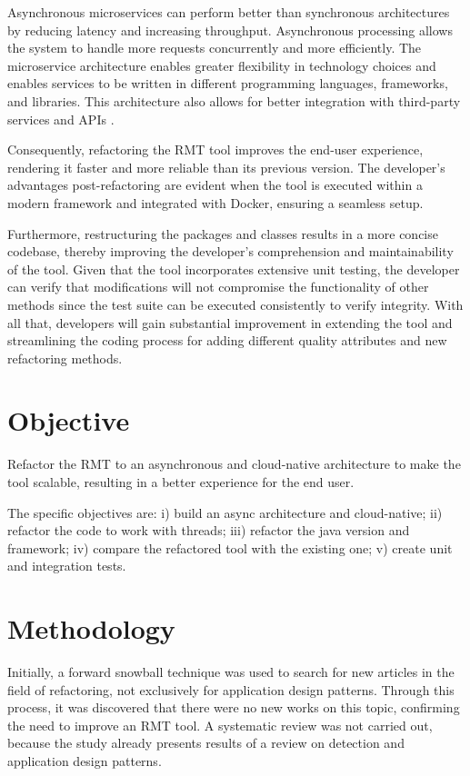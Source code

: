 Asynchronous microservices can perform better than synchronous architectures by reducing latency and increasing throughput. Asynchronous processing allows the system to handle more requests concurrently and more efficiently. The microservice architecture enables greater flexibility in technology choices and enables services to be written in different programming languages, frameworks, and libraries. This architecture also allows for better integration with third-party services and APIs \cite{larrucea2018}.

Consequently, refactoring the RMT tool improves the end-user experience, rendering it faster and more reliable than its previous version. The developer's advantages post-refactoring are evident when the tool is executed within a modern framework and integrated with Docker, ensuring a seamless setup. 

Furthermore, restructuring the packages and classes results in a more concise codebase, thereby improving the developer's comprehension and maintainability of the tool. Given that the tool incorporates extensive unit testing, the developer can verify that modifications will not compromise the functionality of other methods since the test suite can be executed consistently to verify integrity. With all that, developers will gain substantial improvement in extending the tool and streamlining the coding process for adding different quality attributes and new refactoring methods.  


\section{Objective}
Refactor the RMT to an asynchronous and cloud-native architecture to make the tool scalable, resulting in a better experience for the end user.

The specific objectives are: i) build an async architecture and cloud-native; ii) refactor the code to work with threads; iii) refactor the java version and framework; iv) compare the refactored tool with the existing one; v) create unit and integration tests.

\section{Methodology}
Initially, a forward snowball technique was used to search for new articles in the field of refactoring, not exclusively for application design patterns. Through this process, it was discovered that there were no new works on this topic, confirming the need to improve an RMT tool. A systematic review was not carried out, because the study \cite{beluzzo2018abordagem} already presents results of a review on detection and application design patterns.

